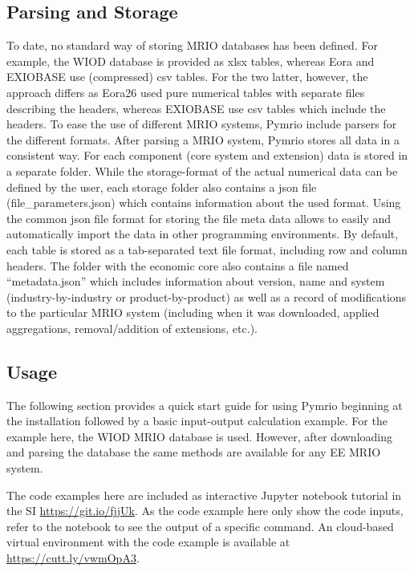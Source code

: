 \documentclass{jors}
\begin{document}
\subsection*{Parsing and Storage}

To date, no standard way of storing MRIO databases has been defined.
For example, the WIOD database \cite{timmer2015} is provided as xlsx tables, whereas Eora \cite{lenzen2013} and EXIOBASE \cite{stadler2018b} use (compressed) csv tables.
For the two latter, however, the approach differs as Eora26 used pure numerical tables with separate files describing the headers, whereas EXIOBASE use csv tables which include the headers.
To ease the use of different MRIO systems, Pymrio include parsers for the different formats.
After parsing a MRIO system, Pymrio stores all data in a consistent way.
For each component (core system and extension) data is stored in a separate folder.
While the storage-format of the actual numerical data can be defined by the user, each storage folder also contains a json file (file\_parameters.json) which contains information about the used format. 
Using the common json file format for storing the file meta data  allows to easily and automatically import the data in other programming environments. 
By default, each table is stored as a tab-separated text file format, including row and column headers.
The folder with the economic core also contains a file named ``metadata.json'' which includes information about version, name and system (industry-by-industry or product-by-product) as well as a record of modifications to the particular MRIO system (including when it was downloaded, applied aggregations, removal/addition of extensions, etc.). 

\subsection*{Usage}

The following section provides a quick start guide for using Pymrio beginning at the installation followed by a basic input-output calculation example.
For the example here, the WIOD MRIO database \cite{timmer2015} is used. 
However, after downloading and parsing the database the same methods are available for any EE MRIO system.

The code examples here are included as interactive Jupyter notebook tutorial in the SI \url{https://git.io/fjjUk}.
As the code example here only show the code inputs, refer to the notebook to see the output of a specific command. 
An cloud-based virtual environment with the code example is available at \url{https://cutt.ly/vwmOpA3}. 
\end{document}
